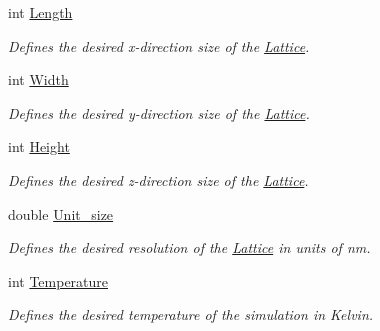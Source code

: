 \begin{DoxyCompactItemize}
int \hyperlink{struct_parameters___simulation_a038f418e1b2e4fec3fc6a8336f8b23de}{Length}
\begin{DoxyCompactList}\small\item\em Defines the desired x-\/direction size of the \hyperlink{class_lattice}{Lattice}. \end{DoxyCompactList}\item 
\mbox{\label{struct_parameters___simulation_aab42f7eb6b5ec1916475d9022ed5165f}} 
int \hyperlink{struct_parameters___simulation_aab42f7eb6b5ec1916475d9022ed5165f}{Width}
\begin{DoxyCompactList}\small\item\em Defines the desired y-\/direction size of the \hyperlink{class_lattice}{Lattice}. \end{DoxyCompactList}\item 
\mbox{\label{struct_parameters___simulation_aa1ffb86ac22065dbbb58196db95b3199}} 
int \hyperlink{struct_parameters___simulation_aa1ffb86ac22065dbbb58196db95b3199}{Height}
\begin{DoxyCompactList}\small\item\em Defines the desired z-\/direction size of the \hyperlink{class_lattice}{Lattice}. \end{DoxyCompactList}\item 
\mbox{\label{struct_parameters___simulation_ab5dda6868bc9359d97a614f027734349}} 
double \hyperlink{struct_parameters___simulation_ab5dda6868bc9359d97a614f027734349}{Unit\+\_\+size}
\begin{DoxyCompactList}\small\item\em Defines the desired resolution of the \hyperlink{class_lattice}{Lattice} in units of nm. \end{DoxyCompactList}\item 
\mbox{\label{struct_parameters___simulation_aad5bdf64239620d1b214c49532dba743}} 
int \hyperlink{struct_parameters___simulation_aad5bdf64239620d1b214c49532dba743}{Temperature}
\begin{DoxyCompactList}\small\item\em Defines the desired temperature of the simulation in Kelvin. \end{DoxyCompactList}\item 

\end{DoxyCompactItemize}
